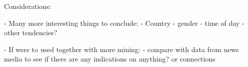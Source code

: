\documentclass[Main]{subfiles}
\begin{document}
Considerations:

- Many more interesting things to conclude:
    - Country
    - gender
    - time of day
    - other tendencies?
    
- If were to used together with more mining:
    - compare with data from news media to see if there are any indications on anything? or connections
    
\end{document}
